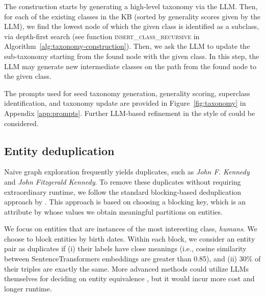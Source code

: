 The construction starts by generating a high-level taxonomy via the LLM.
Then, for each of the existing classes in the KB (sorted by generality scores given by the LLM), we find the lowest node of which the given class is identified as a subclass, via depth-first search (see function \textsc{insert\_class\_recursive} in Algorithm~\ref{alg:taxonomy-construction}).
Then, we ask the LLM to update the sub-taxonomy starting from the found node with the given class.
In this step, the LLM may generate new intermediate classes on the path from the found node to the given class.

The prompts used for seed taxonomy generation, generality scoring, superclass identification, and taxonomy update are provided in Figure~\ref{fig:taxonomy} in Appendix \ref{app:prompts}.
Further LLM-based refinement in the style of \cite{peng2024refining} could be considered.




\subsection{Entity deduplication}

Naive graph exploration frequently yields duplicates, 
such as
\textit{John F. Kennedy} and \textit{John Fitzgerald Kennedy}. To remove these duplicates without requiring extraordinary runtime, we follow the standard blocking-based deduplication approach by \citet{kopcke2010frameworks}. 
This 
approach
is 
based on choosing a blocking key,
which is an
attribute by whose values we obtain meaningful partitions on entities. 

We focus on entities that are instances of the most interesting class, \textit{humans}. We choose to block entities by birth dates.
Within each block, we consider an entity pair as duplicates if 
(i) their labels 
have close meanings (i.e., cosine similarity between SentenceTransformers embeddings are greater than 0.85),
and 
(ii) 30\% of their triples are exactly the same. 
More advanced methods could utilize LLMs themselves for deciding on entity equivalence \cite{ding2024entgpt}, but it would incur more cost and longer runtime.



